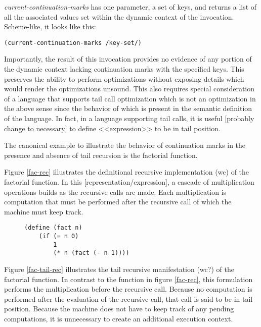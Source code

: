 \documentclass[ms]{byuprop}
\begin{document}
\emph{current-continuation-marks} has one parameter, a set of keys, and returns a list of all the associated values set within the dynamic context of the invocation. Scheme-like, it looks like this:

\begin{verbatim}
(current-continuation-marks /key-set/)
\end{verbatim}

Importantly, the result of this invocation provides no evidence of any portion of the dynamic context lacking continuation marks with the specified keys. This preserves the ability to perform optimizations without exposing details which would render the optimizations unsound. This also requires special consideration of a language that supports tail call optimization which is not an optimization in the above sense since the behavior of which is present in the semantic definition of the language. In fact, in a language supporting tail calls, it is useful [probably change to necessary] to define <<expression>> to be in tail position.

The canonical example to illustrate the behavior of continuation marks in the presence and absence of tail recursion is the factorial function.

Figure \ref{fac-rec} illustrates the definitional recursive 
implementation (wc) of the factorial function. In this 
[representation/expression], a cascade of multiplication operations 
builds as the recursive calls are made. Each multiplication is 
computation that must be performed after the recursive call of which the 
machine must keep track.


\begin{figure}
\begin{verbatim}
(define (fact n)
    (if (= n 0)
        1
        (* n (fact (- n 1))))
\end{verbatim}
\end{figure}

Figure \ref{fac-tail-rec} illustrates the tail recursive manifestation 
(wc?) of the factorial function. In contrast to the function in figure 
\ref{fac-rec}, this formulation performs the multiplication before 
the recursive call. Because no computation is performed after the 
evaluation of the recursive call, that call is said to be in tail 
position. Because the machine does not have to keep track of any pending 
computations, it is unnecessary to create an additional execution 
context.
\end{document}
